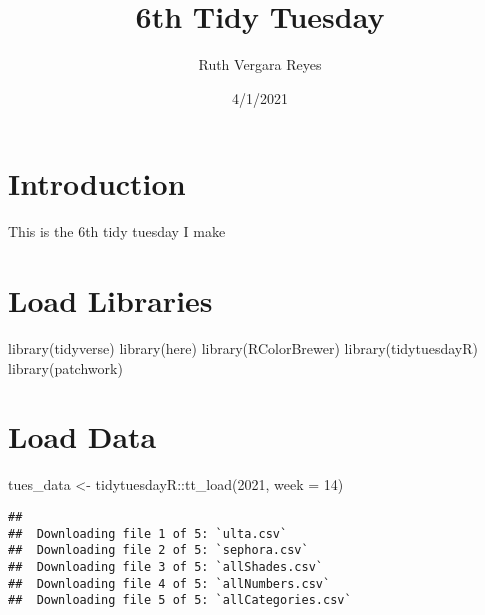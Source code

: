 \documentclass[
]{article}
\title{6th Tidy Tuesday}
\author{Ruth Vergara Reyes}
\date{4/1/2021}
\newenvironment{Shaded}{\begin{snugshade}}{\end{snugshade}}
\newcommand{\AttributeTok}[1]{\textcolor[rgb]{0.77,0.63,0.00}{#1}}
\newcommand{\DecValTok}[1]{\textcolor[rgb]{0.00,0.00,0.81}{#1}}
\newcommand{\FunctionTok}[1]{\textcolor[rgb]{0.00,0.00,0.00}{#1}}
\newcommand{\NormalTok}[1]{#1}
\newcommand{\OtherTok}[1]{\textcolor[rgb]{0.56,0.35,0.01}{#1}}
\newcommand{\SpecialCharTok}[1]{\textcolor[rgb]{0.00,0.00,0.00}{#1}}
\begin{document}
\maketitle

{
\setcounter{tocdepth}{2}
\tableofcontents
}
\hypertarget{introduction}{%
\section{Introduction}\label{introduction}}

This is the 6th tidy tuesday I make

\hypertarget{load-libraries}{%
\section{Load Libraries}\label{load-libraries}}

\begin{Shaded}
\begin{Highlighting}[]
\FunctionTok{library}\NormalTok{(tidyverse)}
\FunctionTok{library}\NormalTok{(here)}
\FunctionTok{library}\NormalTok{(RColorBrewer)}
\FunctionTok{library}\NormalTok{(tidytuesdayR)}
\FunctionTok{library}\NormalTok{(patchwork)}
\end{Highlighting}
\end{Shaded}

\hypertarget{load-data}{%
\section{Load Data}\label{load-data}}

\begin{Shaded}
\begin{Highlighting}[]
\NormalTok{tues\_data }\OtherTok{\textless{}{-}}\NormalTok{ tidytuesdayR}\SpecialCharTok{::}\FunctionTok{tt\_load}\NormalTok{(}\DecValTok{2021}\NormalTok{, }\AttributeTok{week =} \DecValTok{14}\NormalTok{)}
\end{Highlighting}
\end{Shaded}

\begin{verbatim}
## 
##  Downloading file 1 of 5: `ulta.csv`
##  Downloading file 2 of 5: `sephora.csv`
##  Downloading file 3 of 5: `allShades.csv`
##  Downloading file 4 of 5: `allNumbers.csv`
##  Downloading file 5 of 5: `allCategories.csv`
\end{verbatim}

\begin{Shaded}
\end{Shaded}
\end{document}
